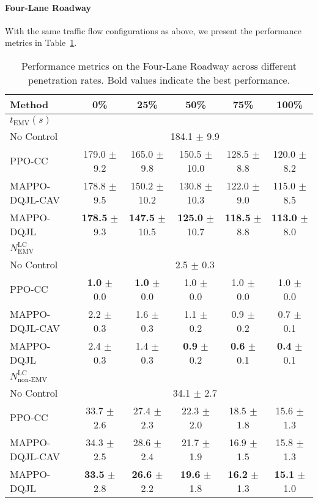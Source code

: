 \paragraph{Four-Lane Roadway} With the same traffic flow configurations as above, we present the performance metrics in Table~\ref{tab:penetration_study_four_lane}.
\begin{table}[htbp]
\centering
{\fontsize{9}{11}\selectfont
\begin{tabular}{lccccc}
\toprule
\textbf{Method} & \textbf{0\%} & \textbf{25\%} & \textbf{50\%} & \textbf{75\%} & \textbf{100\%} \\
\midrule
\textbf{\textit{$t_{\text{EMV}} (s)$}} & & & & & \\ 
\multirow{1}{*}{No Control} & \multicolumn{5}{c}{184.1 $\pm$ 9.9} \\[6pt]
PPO-CC~\cite{suo2024model}
& 179.0 $\pm$ 9.2 & 165.0 $\pm$ 9.8 & 150.5 $\pm$ 10.0 & 128.5 $\pm$ 8.8 & 120.0 $\pm$ 8.2 \\[6pt]
MAPPO-DQJL-CAV
& 178.8 $\pm$ 9.5 & 150.2 $\pm$ 10.2 & 130.8 $\pm$ 10.3 & 122.0 $\pm$ 9.0 & 115.0 $\pm$ 8.5 \\[6pt]
MAPPO-DQJL
& \textbf{178.5} $\pm$ 9.3 & \textbf{147.5} $\pm$ 10.5 & \textbf{125.0} $\pm$ 10.7 & \textbf{118.5} $\pm$ 8.8 & \textbf{113.0} $\pm$ 8.0 \\
\midrule
\textbf{\textit{\boldmath$N_{\text{EMV}}^{\text{LC}}$}} & & & & & \\ 
\multirow{1}{*}{No Control} & \multicolumn{5}{c}{2.5 $\pm$ 0.3} \\[6pt]
PPO-CC~\cite{suo2024model} 
& \textbf{1.0} $\pm$ 0.0 & \textbf{1.0} $\pm$ 0.0 & 1.0 $\pm$ 0.0 & 1.0 $\pm$ 0.0 & 1.0 $\pm$ 0.0 \\[6pt]
MAPPO-DQJL-CAV
& 2.2 $\pm$ 0.3 & 1.6 $\pm$ 0.3 & 1.1 $\pm$ 0.2 & 0.9 $\pm$ 0.2 & 0.7 $\pm$ 0.1 \\[6pt]
MAPPO-DQJL
& 2.4 $\pm$ 0.3 & 1.4 $\pm$ 0.3 & \textbf{0.9} $\pm$ 0.2 & \textbf{0.6} $\pm$ 0.1 & \textbf{0.4} $\pm$ 0.1 \\
\midrule
\textbf{\textit{\boldmath$N_{\text{non-EMV}}^{\text{LC}}$}} & & & & & \\ 
\multirow{1}{*}{No Control} & \multicolumn{5}{c}{34.1 $\pm$ 2.7} \\[6pt]
PPO-CC~\cite{suo2024model}
& 33.7 $\pm$ 2.6 & 27.4 $\pm$ 2.3 & 22.3 $\pm$ 2.0 & 18.5 $\pm$ 1.8 & 15.6 $\pm$ 1.3 \\[6pt]
MAPPO-DQJL-CAV
& 34.3 $\pm$ 2.5 & 28.6 $\pm$ 2.4 & 21.7 $\pm$ 1.9 & 16.9 $\pm$ 1.5 & 15.8 $\pm$ 1.3 \\[6pt]
MAPPO-DQJL
& \textbf{33.5} $\pm$ 2.8 & \textbf{26.6} $\pm$ 2.2 & \textbf{19.6} $\pm$ 1.8 & \textbf{16.2} $\pm$ 1.3 & \textbf{15.1} $\pm$ 1.0 \\
\bottomrule
\end{tabular}
}
\caption{Performance metrics on the Four-Lane Roadway across different penetration rates. Bold values indicate the best performance.}
\label{tab:penetration_study_four_lane}
\end{table}

